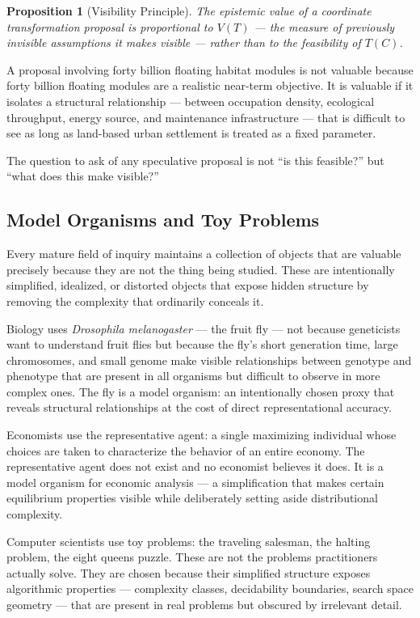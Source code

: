\documentclass[12pt, a4paper]{article}
\theoremstyle{named}
\newtheorem{proposition}{Proposition}
\begin{document}
\begin{proposition}[Visibility Principle]
The epistemic value of a coordinate transformation proposal is
proportional to $V(T)$ — the measure of previously invisible
assumptions it makes visible — rather than to the feasibility of
$T(C)$.
\end{proposition}

A proposal involving forty billion floating habitat modules is not
valuable because forty billion floating modules are a realistic
near-term objective. It is valuable if it isolates a structural
relationship — between occupation density, ecological throughput, energy
source, and maintenance infrastructure — that is difficult to see as
long as land-based urban settlement is treated as a fixed parameter.

The question to ask of any speculative proposal is not ``is this
feasible?'' but ``what does this make visible?''

\subsection{Model Organisms and Toy Problems}

Every mature field of inquiry maintains a collection of objects that
are valuable precisely because they are not the thing being studied.
These are intentionally simplified, idealized, or distorted objects
that expose hidden structure by removing the complexity that ordinarily
conceals it.

Biology uses \textit{Drosophila melanogaster} — the fruit fly — not
because geneticists want to understand fruit flies but because the
fly's short generation time, large chromosomes, and small genome make
visible relationships between genotype and phenotype that are present
in all organisms but difficult to observe in more complex ones. The
fly is a model organism: an intentionally chosen proxy that reveals
structural relationships at the cost of direct representational
accuracy.

Economists use the representative agent: a single maximizing individual
whose choices are taken to characterize the behavior of an entire
economy. The representative agent does not exist and no economist
believes it does. It is a model organism for economic analysis — a
simplification that makes certain equilibrium properties visible while
deliberately setting aside distributional complexity.

Computer scientists use toy problems: the traveling salesman, the
halting problem, the eight queens puzzle. These are not the problems
practitioners actually solve. They are chosen because their simplified
structure exposes algorithmic properties — complexity classes,
decidability boundaries, search space geometry — that are present in
real problems but obscured by irrelevant detail.
\end{document}
